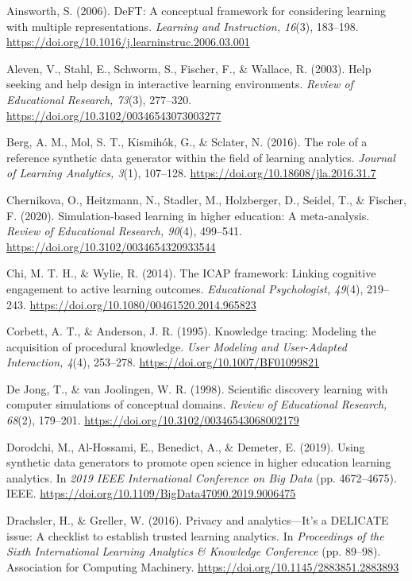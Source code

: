 \documentclass[11pt]{article}
\begin{document}
\begin{references}
\item Ainsworth, S. (2006). DeFT: A conceptual framework for considering learning with multiple representations. \textit{Learning and Instruction, 16}(3), 183–198. \url{https://doi.org/10.1016/j.learninstruc.2006.03.001}
\item Aleven, V., Stahl, E., Schworm, S., Fischer, F., \& Wallace, R. (2003). Help seeking and help design in interactive learning environments. \textit{Review of Educational Research, 73}(3), 277–320. \url{https://doi.org/10.3102/00346543073003277}
\item Berg, A. M., Mol, S. T., Kismihók, G., \& Sclater, N. (2016). The role of a reference synthetic data generator within the field of learning analytics. \textit{Journal of Learning Analytics, 3}(1), 107–128. \url{https://doi.org/10.18608/jla.2016.31.7}
\item Chernikova, O., Heitzmann, N., Stadler, M., Holzberger, D., Seidel, T., \& Fischer, F. (2020). Simulation-based learning in higher education: A meta-analysis. \textit{Review of Educational Research, 90}(4), 499–541. \url{https://doi.org/10.3102/0034654320933544}
\item Chi, M. T. H., \& Wylie, R. (2014). The ICAP framework: Linking cognitive engagement to active learning outcomes. \textit{Educational Psychologist, 49}(4), 219–243. \url{https://doi.org/10.1080/00461520.2014.965823}
\item Corbett, A. T., \& Anderson, J. R. (1995). Knowledge tracing: Modeling the acquisition of procedural knowledge. \textit{User Modeling and User-Adapted Interaction, 4}(4), 253–278. \url{https://doi.org/10.1007/BF01099821}
\item De Jong, T., \& van Joolingen, W. R. (1998). Scientific discovery learning with computer simulations of conceptual domains. \textit{Review of Educational Research, 68}(2), 179–201. \url{https://doi.org/10.3102/00346543068002179}
\item Dorodchi, M., Al-Hossami, E., Benedict, A., \& Demeter, E. (2019). Using synthetic data generators to promote open science in higher education learning analytics. In \textit{2019 IEEE International Conference on Big Data} (pp. 4672–4675). IEEE. \url{https://doi.org/10.1109/BigData47090.2019.9006475}
\item Drachsler, H., \& Greller, W. (2016). Privacy and analytics—It’s a DELICATE issue: A checklist to establish trusted learning analytics. In \textit{Proceedings of the Sixth International Learning Analytics \& Knowledge Conference} (pp. 89–98). Association for Computing Machinery. \url{https://doi.org/10.1145/2883851.2883893}

\end{references}
\end{document}
